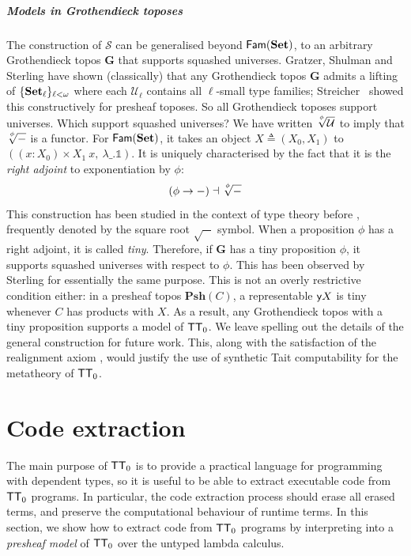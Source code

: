 \documentclass[10pt,a4paper]{article}
\theoremstyle{definition}
\theoremstyle{remark}
\newcommand{\s}[1]{{\ensuremath{\textsf{\upshape #1}}}\xspace}
\newcommand{\cl}[1]{{\ensuremath{\mathcal{#1}}}\xspace}
\newcommand{\re}[1]{{\ensuremath{\mathbf{#1}}}\xspace}
\newcommand{\std}[1]{\ensuremath{\mathbb{#1}}\xspace}
\newcommand{\mth}[1]{\ensuremath{\textbf{\upshape #1}}\xspace}
\newcommand{\Set}{\mth{Set}}
\newcommand{\Psh}[1]{\ensuremath{\re{Psh}({#1})}\xspace}
\newcommand{\yoneda}{\s{y}}
\newcommand{\univ}{\cl{U}}
\newcommand{\ZTT}{\ensuremath{\s{TT}_0}\xspace}
\newcommand{\amazing}[2]{\sqrt[\uproot{4}{#1}]{#2}}
\begin{document}
\subparagraph{Models in Grothendieck toposes} \label{ssub:mod-gro}

The construction of $\cl S$ can be generalised beyond
$\s{Fam}(\Set)$, to an arbitrary Grothendieck topos $\re G$ that supports
squashed universes. Gratzer, Shulman and Sterling \cite{Gratzer2022-gn} have
shown (classically) that any Grothendieck topos $\re G$ admits a lifting of
$\{\Set_\ell\}_{\ell < \omega}$ where each $\univ_\ell$ contains all
$\ell$-small type families; Streicher~\cite{Streicher2005-tm} showed this
constructively for presheaf toposes. So all Grothendieck toposes support
universes. Which support squashed universes? We have written
$\amazing{\phi}{\univ}$ to imply that $\amazing{\phi}{-}$ is a functor. For
$\s{Fam}(\Set)$, it takes an object $X \triangleq (X_0, X_1)$ to $((x : X_0)
\times X_1\ x,\ \lambda\_.\std 1)$. It is uniquely characterised by the fact
that it is the \emph{right adjoint} to exponentiation by $\phi$:
$$
(\phi \to -) \dashv \amazing{\phi}{-}
$$
This construction has been studied in the context of type theory before
\cite{Licata2018-fe,Nuyts2020-pu,Sterling2021-kp,Riley2024-zk}, frequently
denoted by the square root $\sqrt{-}$ symbol. When a proposition $\phi$ has a
right adjoint, it is called \emph{tiny}. Therefore, if $\re G$ has a tiny
proposition $\phi$, it supports squashed universes with respect to $\phi$. This
has been observed by Sterling \cite{Sterling2023-jx} for essentially the same
purpose. This is not an overly restrictive condition either: in a presheaf topos
$\Psh{C}$, a representable $\yoneda X$ is tiny whenever $C$ has products
with $X$. As a result, any Grothendieck topos with a tiny proposition supports a
model of \ZTT. We leave spelling out the details of the general construction for
future work. This, along with the satisfaction of the realignment axiom
\cite{Gratzer2022-gn}, would justify the use of synthetic Tait computability
\cite{Sterling2022-ym} for the metatheory of \ZTT.


\section{Code extraction}\label{sub:code-extr}

The main purpose of \ZTT is to provide a practical language for programming with
dependent types, so it is useful to be able to extract executable code from \ZTT
programs. In particular, the code extraction process should erase all erased
terms, and preserve the computational behaviour of runtime terms. In this
section, we show how to extract code from $\ZTT$ programs by interpreting into a
\emph{presheaf model} of \ZTT over the untyped lambda calculus.
\end{document}
